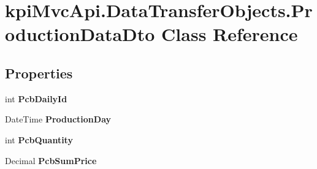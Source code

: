 \hypertarget{classkpi_mvc_api_1_1_data_transfer_objects_1_1_production_data_dto}{}\section{kpi\+Mvc\+Api.\+Data\+Transfer\+Objects.\+Production\+Data\+Dto Class Reference}
\label{classkpi_mvc_api_1_1_data_transfer_objects_1_1_production_data_dto}
\subsection*{Properties}
\begin{DoxyCompactItemize}
\item 
\mbox{\label{classkpi_mvc_api_1_1_data_transfer_objects_1_1_production_data_dto_ada9471296e56fbddf87a940ed1b1b88f}} 
int {\bfseries Pcb\+Daily\+Id}
\item 
\mbox{\label{classkpi_mvc_api_1_1_data_transfer_objects_1_1_production_data_dto_a9a9631598c932f090384ec903880ca67}} 
Date\+Time {\bfseries Production\+Day}
\item 
\mbox{\label{classkpi_mvc_api_1_1_data_transfer_objects_1_1_production_data_dto_a3408775cae304e2a6cd4c5b552c3297c}} 
int {\bfseries Pcb\+Quantity}
\item 
\mbox{\label{classkpi_mvc_api_1_1_data_transfer_objects_1_1_production_data_dto_a768d34bc3027bf583498fa08ee235e0c}} 
Decimal {\bfseries Pcb\+Sum\+Price}
\item 
\mbox{\label{classkpi_mvc_api_1_1_data_transfer_objects_1_1_production_data_dto_a2e933cf5f6b7ff45d576328969e0c36e}} 

\end{DoxyCompactItemize}
